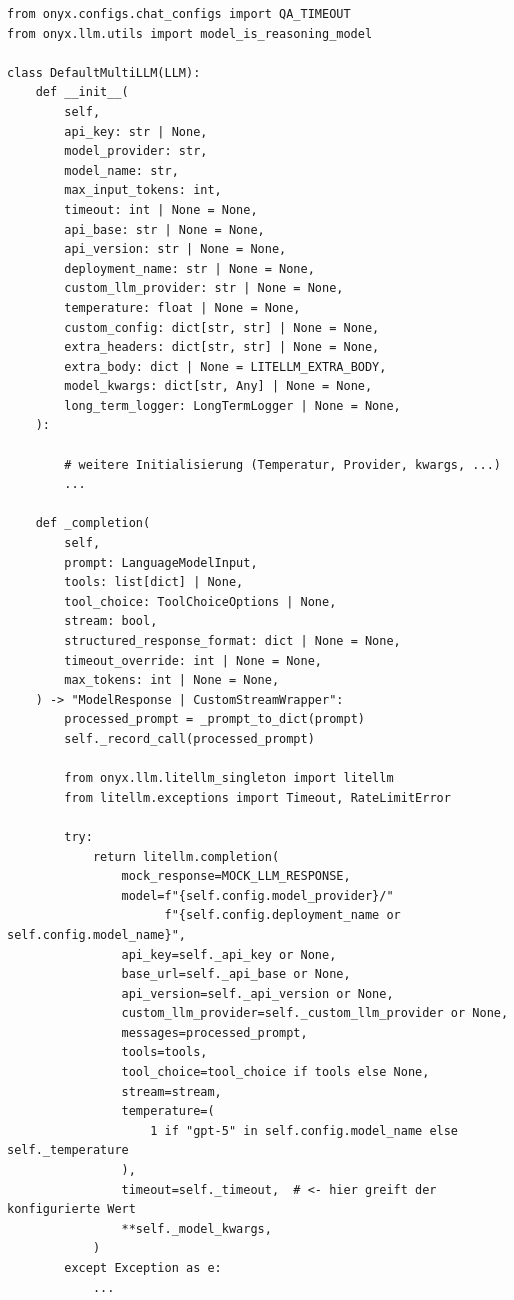 \FloatBarrier
\begin{listing}[H]
    \begin{verbatim}
from onyx.configs.chat_configs import QA_TIMEOUT
from onyx.llm.utils import model_is_reasoning_model

class DefaultMultiLLM(LLM):
    def __init__(
        self,
        api_key: str | None,
        model_provider: str,
        model_name: str,
        max_input_tokens: int,
        timeout: int | None = None,
        api_base: str | None = None,
        api_version: str | None = None,
        deployment_name: str | None = None,
        custom_llm_provider: str | None = None,
        temperature: float | None = None,
        custom_config: dict[str, str] | None = None,
        extra_headers: dict[str, str] | None = None,
        extra_body: dict | None = LITELLM_EXTRA_BODY,
        model_kwargs: dict[str, Any] | None = None,
        long_term_logger: LongTermLogger | None = None,
    ):

        # weitere Initialisierung (Temperatur, Provider, kwargs, ...)
        ...

    def _completion(
        self,
        prompt: LanguageModelInput,
        tools: list[dict] | None,
        tool_choice: ToolChoiceOptions | None,
        stream: bool,
        structured_response_format: dict | None = None,
        timeout_override: int | None = None,
        max_tokens: int | None = None,
    ) -> "ModelResponse | CustomStreamWrapper":
        processed_prompt = _prompt_to_dict(prompt)
        self._record_call(processed_prompt)

        from onyx.llm.litellm_singleton import litellm
        from litellm.exceptions import Timeout, RateLimitError

        try:
            return litellm.completion(
                mock_response=MOCK_LLM_RESPONSE,
                model=f"{self.config.model_provider}/"
                      f"{self.config.deployment_name or self.config.model_name}",
                api_key=self._api_key or None,
                base_url=self._api_base or None,
                api_version=self._api_version or None,
                custom_llm_provider=self._custom_llm_provider or None,
                messages=processed_prompt,
                tools=tools,
                tool_choice=tool_choice if tools else None,
                stream=stream,
                temperature=(
                    1 if "gpt-5" in self.config.model_name else self._temperature
                ),
                timeout=self._timeout,  # <- hier greift der konfigurierte Wert
                **self._model_kwargs,
            )
        except Exception as e:
            ...
    \end{verbatim}
    \caption{Vereinfachter Ausschnitt aus \texttt{DefaultMultiLLM} in Onyx}
    \label{lst:defaultmultillm-timeout}
\end{listing}
\FloatBarrier

